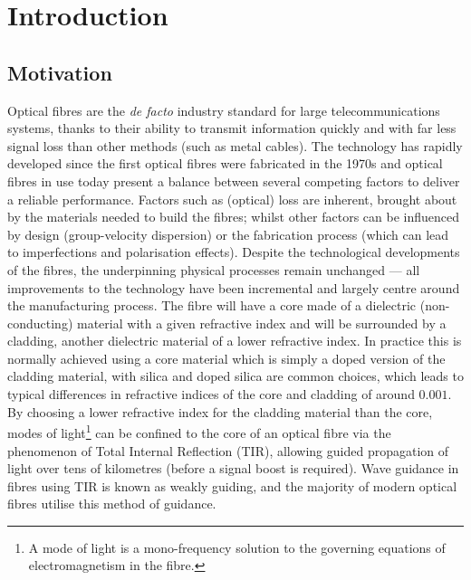 \chapter{Introduction} \label{ch:Intro}

\section{Motivation} \label{sec:ProjectMotivation}
Optical fibres are the \textit{de facto} industry standard for large telecommunications systems, thanks to their ability to transmit information quickly and with far less signal loss than other methods (such as metal cables).
The technology has rapidly developed since the first optical fibres were fabricated in the 1970s \cite{knight2003photonic} and optical fibres in use today present a balance between several competing factors to deliver a reliable performance.
Factors such as (optical) loss are inherent, brought about by the materials needed to build the fibres; whilst other factors can be influenced by design (group-velocity dispersion) or the fabrication process (which can lead to imperfections and polarisation effects).
Despite the technological developments of the fibres, the underpinning physical processes remain unchanged --- all improvements to the technology have been incremental and largely centre around the manufacturing process.
The fibre will have a core made of a dielectric (non-conducting) material with a given refractive index and will be surrounded by a cladding, another dielectric material of a lower refractive index.
In practice this is normally achieved using a core material which is simply a doped version of the cladding material, with silica and doped silica are common choices, which leads to typical differences in refractive indices of the core and cladding of around $0.001$.
By choosing a lower refractive index for the cladding material than the core, modes of light\footnote{A mode of light is a mono-frequency solution to the governing equations of electromagnetism in the fibre.} can be confined to the core of an optical fibre via the phenomenon of Total Internal Reflection (TIR), allowing guided propagation of light over tens of kilometres (before a signal boost is required).
Wave guidance in fibres using TIR is known as weakly guiding, and the majority of modern optical fibres utilise this method of guidance. \newline

